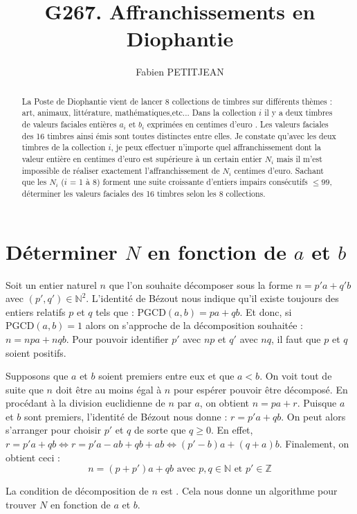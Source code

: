 \documentclass[11pt]{article}
\title{G267. Affranchissements en Diophantie}
\author{Fabien PETITJEAN}
\begin{document}
\maketitle
\begin{abstract}
La Poste de Diophantie vient de  lancer 8 collections de timbres sur différents thèmes : art, animaux, littérature, mathématiques,etc... Dans la collection $i$ il y a deux timbres de valeurs faciales entières $a_i$  et $b_i$  exprimées en centimes d’euro . Les valeurs faciales des 16 timbres ainsi  émis sont toutes distinctes entre elles.
Je constate qu’avec les deux timbres de  la collection $i$, je peux effectuer n’importe quel affranchissement dont la valeur entière en centimes d’euro est supérieure à un certain entier $N_i$  mais il m’est impossible de réaliser  exactement l’affranchissement de $N_i$  centimes d’euro.
Sachant que les $N_i$ ($i$ = 1 à 8) forment une suite croissante d’entiers impairs consécutifs $\leq 99$, déterminer les valeurs faciales  des 16 timbres selon les 8 collections.
\end{abstract}

\section{Déterminer $N$ en fonction de $a$ et $b$}

Soit un entier naturel $n$ que l'on souhaite décomposer sous la forme 
$n = p'a + q'b$ avec $(p', q') \in \mathbb{N}^2$.
L'identité de Bézout nous indique qu'il existe toujours des entiers relatifs $p$ et $q$ tels que :
$\text{PGCD}(a,b) = pa + qb$.
Et donc, si $\text{PGCD}(a,b)=1$ alors on s'approche de la décomposition souhaitée :
$n = npa + nqb$. Pour pouvoir identifier $p'$ avec $np$ et $q'$ avec $nq$, il faut que $p$ et $q$ soient positifs.

Supposons que $a$ et $b$ soient premiers entre eux et que $a < b$. 
On voit tout de suite que $n$ doit être au moins égal à $n$ pour espérer pouvoir être décomposé.
En procédant à la division euclidienne de $n$ par $a$, on obtient
$n = pa + r$.
Puisque $a$ et $b$ sont premiers, l'identité de Bézout nous donne :
$r = p'a + qb$.
On peut alors s'arranger pour choisir $p'$ et $q$ de sorte que $q \geq 0$.
En effet, 
$r = p'a + qb \Leftrightarrow r = p'a - ab + qb + ab \Leftrightarrow (p' - b)a + (q + a)b$. 
Finalement, on obtient ceci :
$$n = (p + p')a + qb \text{ avec } p, q \in \mathbb{N} \text{ et } p'\in\mathbb{Z}$$

La condition de décomposition de $n$ est . Cela nous donne un algorithme pour trouver $N$ en fonction de $a$ et $b$.
\end{document}

